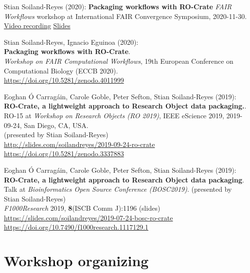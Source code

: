 Stian Soiland-Reyes (2020):
\textbf{Packaging workflows with RO-Crate} 
\emph{FAIR Workflows} workshop at
{International FAIR Convergence Symposium}, 2020-11-30.
\href{https://vimeo.com/499270810}{Video recording}
\href{https://drive.google.com/file/d/1lYAdqm7RESqA9zplTXd4JFJUmome66ui}{Slides}

Stian Soiland-Reyes, Ignacio Eguinoa (2020):\\
\textbf{Packaging workflows with RO-Crate}.\\
{\emph{Workshop on FAIR Computational Workflows}}, 19th European Conference on
Computational Biology
({ECCB 2020}).\\
\url{https://doi.org/10.5281/zenodo.4011999}

Eoghan Ó Carragáin, Carole Goble, Peter Sefton, Stian Soiland-Reyes
(2019):\\
\textbf{RO-Crate, a lightweight approach to Research Object data packaging.}.\\
RO-15 at \emph{Workshop on Research Objects
(RO 2019)}, IEEE eScience 2019, 2019-09-24, San Diego, CA, USA.\\
(presented by Stian Soiland-Reyes)\\
\url{http://slides.com/soilandreyes/2019-09-24-ro-crate}\\
\url{https://doi.org/10.5281/zenodo.3337883}

Eoghan Ó Carragáin, Carole Goble, Peter Sefton, Stian Soiland-Reyes
(2019):\\
\textbf{RO-Crate, a lightweight approach to Research Object data packaging}.\\
Talk at \emph{Bioinformatics Open Source Conference (BOSC2019)}.
(presented by Stian Soiland-Reyes)\\
\emph{F1000Research} 2019, \textbf{8}(ISCB Comm J):1196 (slides)\\
\url{https://slides.com/soilandreyes/2019-07-24-bosc-ro-crate}\\
\url{https://doi.org/10.7490/f1000research.1117129.1}


\section{Workshop organizing}


